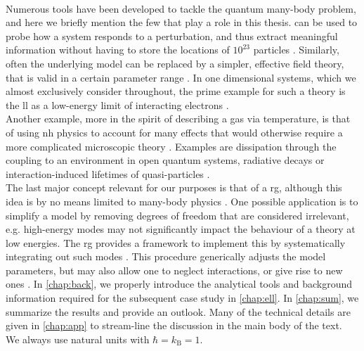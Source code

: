 \\
Numerous tools have been developed to tackle the quantum many-body problem, and here we briefly mention the few that play a role in this thesis.
 can be used to probe how a system responds to a perturbation, and thus extract meaningful information without having to store the locations of $10^{23}$ particles \cite[]{QMB_Inkson_1984}.
Similarly, often the underlying model can be replaced by a simpler, effective field theory, that is valid in a certain parameter range \cite{RG_EFT_lowDim_Yanagisawa_2017,EFT_brauner2022snowmass}.
In one dimensional systems, which we almost exclusively consider throughout, the prime example for such a theory is the \acrlong{ll} as a low-energy limit of interacting electrons \cite{Gogolin_1999,Giamarchi_2004}.\\
Another example, more in the spirit of describing a gas via temperature, is that of using \acrlong{nh} physics to account for many effects that would otherwise require a more complicated microscopic theory \cite{ExceptTop_RevModPhys.93.015005}.
Examples are dissipation through the coupling to an environment in open quantum systems, radiative decays or interaction-induced lifetimes of quasi-particles
\cite{NH_Physics_review_Ashida_2020}.\\
The last major concept relevant for our purposes is that of a \acrlong{rg}, although this idea is by no means limited to many-body physics \cite{RG_Theory_Fisher_1998,RG_Wilson_fRG_review_Dupuis_2021}. 
One possible application is to simplify a model by removing degrees of freedom that are considered irrelevant, e.g. high-energy modes may not significantly impact the behaviour of a theory at low energies.
The \acrlong{rg} provides a framework to implement this by systematically integrating out such modes \cite[\ssec II]{RG_Theory_Fisher_1998}.
This procedure generically adjusts the model parameters, but may also allow one to neglect interactions, or give rise to new ones \cites[]{AltlandSimons}{QFT_RG_OPE_Collins_1984}.
In \autoref{chap:back}, we properly introduce the analytical tools and background information required for the subsequent case study in \autoref{chap:ell}.
In \autoref{chap:sum}, we summarize the results and provide an outlook.
Many of the technical details are given in \autoref{chap:app} to stream-line the discussion in the main body of the text.\\
We always use natural units with $\hbar=k_\text{B}=1$.